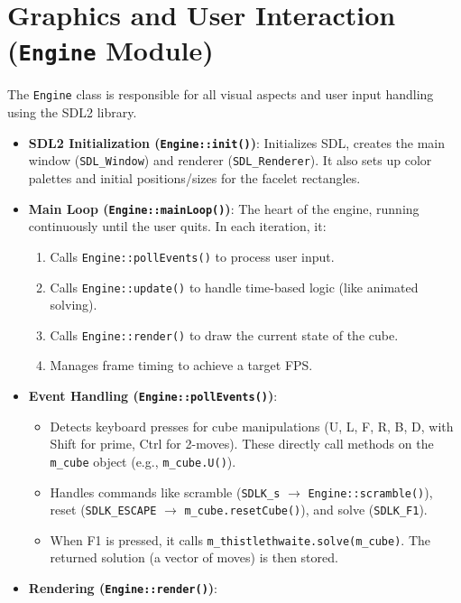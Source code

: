 \documentclass[11pt, a4paper]{article}
\begin{document}
\section{Graphics and User Interaction (\texttt{Engine} Module)}
The \texttt{Engine} class is responsible for all visual aspects and user input handling using the SDL2 library.

\begin{itemize}
    \item \textbf{SDL2 Initialization (\texttt{Engine::init()})}: Initializes SDL, creates the main window (\texttt{SDL\_Window}) and renderer (\texttt{SDL\_Renderer}). It also sets up color palettes and initial positions/sizes for the facelet rectangles.
    \item \textbf{Main Loop (\texttt{Engine::mainLoop()})}: The heart of the engine, running continuously until the user quits. In each iteration, it:
        \begin{enumerate}
            \item Calls \texttt{Engine::pollEvents()} to process user input.
            \item Calls \texttt{Engine::update()} to handle time-based logic (like animated solving).
            \item Calls \texttt{Engine::render()} to draw the current state of the cube.
            \item Manages frame timing to achieve a target FPS.
        \end{enumerate}
    \item \textbf{Event Handling (\texttt{Engine::pollEvents()})}:
        \begin{itemize}
            \item Detects keyboard presses for cube manipulations (U, L, F, R, B, D, with Shift for prime, Ctrl for 2-moves). These directly call methods on the \texttt{m\_cube} object (e.g., \texttt{m\_cube.U()}).
            \item Handles commands like scramble (\texttt{SDLK\_s} $\rightarrow$ \texttt{Engine::scramble()}), reset (\texttt{SDLK\_ESCAPE} $\rightarrow$ \texttt{m\_cube.resetCube()}), and solve (\texttt{SDLK\_F1}).
            \item When F1 is pressed, it calls \texttt{m\_thistlethwaite.solve(m\_cube)}. The returned solution (a vector of moves) is then stored.
        \end{itemize}
    \item \textbf{Rendering (\texttt{Engine::render()})}:
        \begin{itemize}

\end{itemize}
\end{itemize}
\end{document}
